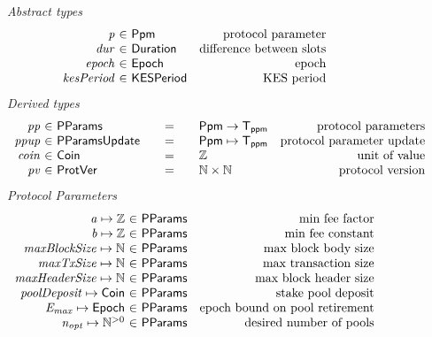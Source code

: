 \begin{figure*}[htb]
  \emph{Abstract types}
  \begin{equation*}
    \begin{array}{r@{~\in~}lr}
      \var{p} & \Ppm & \text{protocol parameter}\\
      \var{dur} & \Duration & \text{difference between slots}\\
      \var{epoch} & \Epoch & \text{epoch} \\
      \var{kesPeriod} & \KESPeriod & \text{KES period} \\
    \end{array}
  \end{equation*}
  \emph{Derived types}
  \begin{equation*}
    \begin{array}{r@{~\in~}l@{\qquad=\qquad}lr}
      \var{pp}
      & \PParams
      & \Ppm \to \mathsf{T_{ppm}}
      & \text{protocol parameters}
      \\
      \var{ppup}
      & \PParamsUpdate
      & \Ppm \mapsto \mathsf{T_{ppm}}
      & \text{protocol parameter update}
      \\
      \var{coin}
      & \Coin
      & \Z
      & \text{unit of value}
      \\
      \var{pv}
      & \ProtVer
      & \N\times\N
      & \text{protocol version}
    \end{array}
  \end{equation*}
  \emph{Protocol Parameters}
  \begin{equation*}
      \begin{array}{r@{~\in~}lr}
        \var{a} \mapsto \Z & \PParams & \text{min fee factor}\\
        \var{b} \mapsto \Z & \PParams & \text{min fee constant}\\
        \var{maxBlockSize} \mapsto \N & \PParams & \text{max block body size}\\
        \var{maxTxSize} \mapsto \N & \PParams & \text{max transaction size}\\
        \var{maxHeaderSize} \mapsto \N & \PParams & \text{max block header size}\\
        \var{poolDeposit} \mapsto \Coin & \PParams & \text{stake pool deposit}\\
        \var{E_{max}} \mapsto \Epoch & \PParams & \text{epoch bound on pool retirement}\\
        \var{n_{opt}} \mapsto \Npos & \PParams & \text{desired number of pools}\\

\end{array}
\end{equation*}
\end{figure*}
